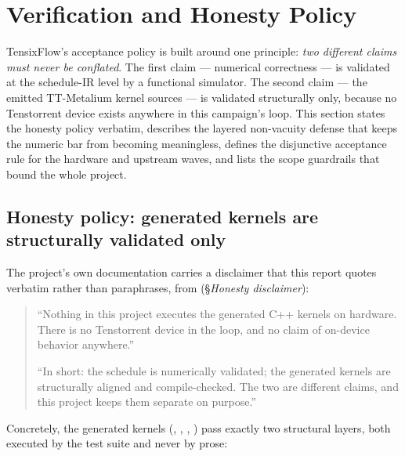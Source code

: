 \section{Verification and Honesty Policy}\label{sec:policy}

TensixFlow's acceptance policy is built around one principle: \emph{two different
claims must never be conflated}. The first claim --- numerical correctness --- is
validated at the schedule-IR level by a functional simulator. The second claim ---
the emitted TT-Metalium kernel sources --- is validated structurally only, because
no Tenstorrent device exists anywhere in this campaign's loop. This section states
the honesty policy verbatim, describes the layered non-vacuity defense that keeps
the numeric bar from becoming meaningless, defines the disjunctive acceptance rule
for the hardware and upstream waves, and lists the scope guardrails that bound the
whole project.

\subsection{Honesty policy: generated kernels are structurally validated only}
\label{sec:policy-honesty}

The project's own documentation carries a disclaimer that this report quotes
verbatim rather than paraphrases, from 
(\S\emph{Honesty disclaimer}):

\begin{quote}
``Nothing in this project executes the generated C++ kernels on hardware. There is
no Tenstorrent device in the loop, and no claim of on-device behavior anywhere.''

\smallskip
``In short: the schedule is numerically validated; the generated kernels are
structurally aligned and compile-checked. The two are different claims, and this
project keeps them separate on purpose.''
\end{quote}

Concretely, the generated kernels (, ,
, ) pass exactly two structural layers, both
executed by the test suite and never by prose:


